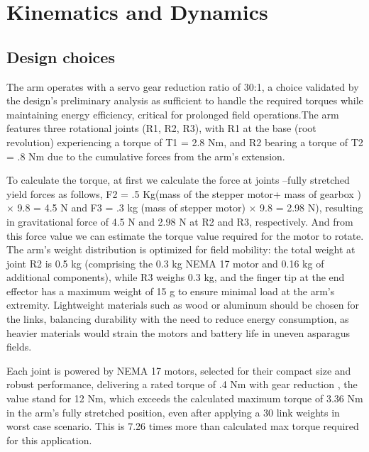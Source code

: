 \chapter{Kinematics and Dynamics}


\section{Design choices }

The arm operates with a servo gear reduction ratio of
30:1, a choice validated by the design’s preliminary analysis as sufficient 
to handle the required torques while maintaining energy efficiency, critical 
for prolonged field operations.The arm features three rotational joints
(R1, R2, R3), with R1 at the base (root revolution) experiencing a torque of
T1 = 2.8 Nm, and R2 bearing a torque of T2 = .8 Nm due to the cumulative
forces from the arm’s extension. 





To calculate the torque, at first we calculate the force at joints –fully 
stretched yield forces as follows, F2 = .5 Kg(mass of the stepper motor+ mass of
gearbox ) × 9.8 = 4.5 N and F3 = .3 kg (mass of stepper motor) × 9.8
= 2.98 N), resulting in gravitational force of 4.5 N and 2.98 N at R2 and
R3, respectively. And from this force value we can estimate the torque value
required for the motor to rotate. The arm’s weight distribution is optimized
for field mobility: the total weight at joint R2 is 0.5 kg (comprising the 0.3
kg NEMA 17 motor and 0.16 kg of additional components), while R3 weighs
0.3 kg, and the finger tip at the end effector has a maximum weight of 15 g
to ensure minimal load at the arm’s extremity. Lightweight materials such as
wood or aluminum should be chosen for the links, balancing durability with
the need to reduce energy consumption, as heavier materials would strain the
motors and battery life in uneven asparagus fields.


Each joint is powered by NEMA 17 motors, 
selected for their compact size and robust performance, delivering a rated torque 
of .4 Nm with gear reduction , the value stand for 12 Nm, which exceeds the 
calculated maximum torque of 3.36 Nm in the arm’s fully stretched position, even 
after applying a 30%
link weights in worst case scenario. This is 7.26 times more than calculated max
torque required for this application. 








